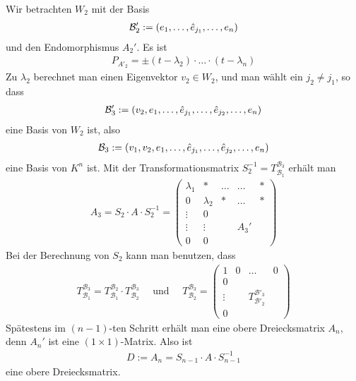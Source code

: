 
Wir betrachten $W_2$ mit der Basis
\begin{align*}
    \mathcal{B}_2' := \left( e_1 , \dots , \hat{e}_{j_1} , \dots , e_n \right)
\end{align*}
und den Endomorphismus $A_2'$. Es ist
\begin{align*}
    P_{A'_2} = \pm (t-\lambda_2) \cdot \dots \cdot (t-\lambda_n)
\end{align*}
Zu $\lambda_2$ berechnet man einen Eigenvektor $v_2 \in W_2$, und man wählt ein
$j_2 \neq j_1$, so dass 
\begin{align*}
    \mathcal{B}_3' := \left( v_2 , e_1 , \dots , \hat{e}_{j_1} , \dots , \hat{e}_{j_2} , \dots , e_n \right)
\end{align*}
eine Basis von $W_2$ ist, also
\begin{align*}
    \mathcal{B}_3 := \left( v_1, v_2 , e_1 , \dots , \hat{e}_{j_1} , \dots , \hat{e}_{j_2} , \dots , e_n \right)
\end{align*}
eine Basis von $K^n$ ist. Mit der Transformationsmatrix $S_2^{-1} = T_{\mathcal{B}_1}^{\mathcal{B}_3}$
erhält man
\begin{align*}
    A_3 = S_2 \cdot A \cdot S_2^{-1} = \begin{pmatrix}
        \lambda_1 & * & \dots & \dots & * \\
        0 & \lambda_2 & * & \dots & * \\
        \vdots & 0 & & & \\
        \vdots & \vdots & & A_3' & \\
        0 & 0 & & &
    \end{pmatrix}
\end{align*}
Bei der Berechnung von $S_2$ kann man benutzen, dass
\begin{align*}
    T_{\mathcal{B}_1}^{\mathcal{B}_3} = T_{\mathcal{B}_1}^{\mathcal{B}_2} \cdot T_{\mathcal{B}_2}^{\mathcal{B}_3}
    \quad \text{   und   } \quad
    T_{\mathcal{B}_2}^{\mathcal{B}_3} = \begin{pmatrix}
        1 & 0 & \dots & 0 \\
        0 & & & \\
        \vdots & & T_{\mathcal{B}'_2}^{\mathcal{B}'_3} & \\
        0 & & &
    \end{pmatrix}
\end{align*}
Spätestens im $(n-1)$-ten Schritt erhält man eine obere Dreiecksmatrix $A_n$, denn
$A_n'$ ist eine $(1 \times 1)$-Matrix. Also ist
\begin{align*}
    D := A_n = S_{n-1} \cdot A \cdot S_{n-1}^{-1}
\end{align*}
eine obere Dreiecksmatrix.








